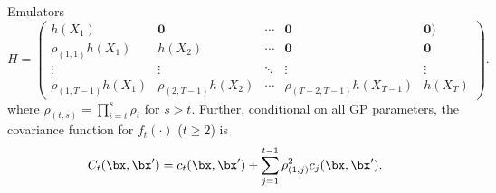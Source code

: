 \begin{chapter}{Emulators \label{Ch:Emulators}}
\begin{equation}
  H = \begin{pmatrix}
    h(X_1) & \bm{0} & \cdots & \bm{0} & \bm{0}) \\
    \rho_{(1,1)} h(X_1) & h(X_2) & \cdots & \bm{0} & \bm{0}\\
    \vdots & \vdots & \ddots & \vdots & \vdots\\
    \rho_{(1, T-1)} h(X_1) & \rho_{(2, T-1)}h(X_2) &\cdots &\rho_{(T-2, T-1)}h(X_{T-1}) & h(X_T)
\end{pmatrix}.
\end{equation}
where $\rho_{(t, s)} = \prod_{i = t}^s \rho_i$ for $s>t$. Further, conditional on all GP parameters, the covariance function for $f_t(\cdot)$ ($t \geq 2$) is
\begin{equation}
  C_t(\bx, \bx') = c_t(\bx, \bx') + \sum_{j = 1}^{t-1} \rho_{(1, j)}^2 c_j(\bx, \bx').
\end{equation}

\end{chapter}
